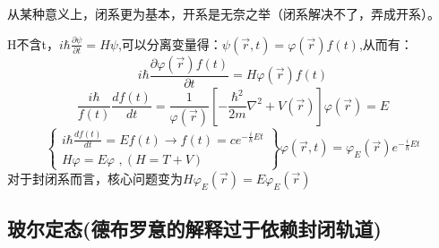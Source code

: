 从某种意义上，闭系更为基本，开系是无奈之举（闭系解决不了，弄成开系）。

H不含t，$i\hbar \frac{\partial \psi}{\partial t}=H\psi $,可以分离变量得：$\psi(\vec{r},t)=\varphi(\vec{r})f(t) $,从而有：
$$ i \hbar \frac{\partial\varphi(\vec{r})f(t)}{\partial t} = H\varphi(\vec{r})f(t) $$
$$ \frac{i\hbar}{f(t)} \frac{df(t)}{dt} = \frac{1}{\varphi(\vec{r})} [-\frac{\hbar^2}{2m} \nabla^2 +V(\vec{r})]\varphi(\vec{r}) = E $$
$$ \left\{ \begin{matrix}
i\hbar\frac{df(t)}{dt} = Ef(t)  \rightarrow  f(t) = ce^{-\frac{i}{\hbar}Et}\\H\varphi = E\varphi \,\, ,(H=T+V)
\end{matrix} \right\} \varphi(\vec{r},t) = \varphi_E(\vec{r})e^{-\frac{i}{\hbar}Et}$$
对于封闭系而言，核心问题变为$H\varphi _E(\vec{r}) = E\varphi_E(\vec{r}) $

\subsection{玻尔定态(德布罗意的解释过于依赖封闭轨道) }

